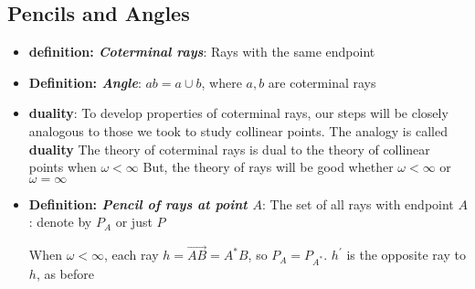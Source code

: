 \documentclass{report}
\begin{document}
    \pagebreak 
    \subsection{Pencils and Angles}
    \begin{itemize}
        \item \textbf{definition: \textit{Coterminal rays}}: Rays with the same endpoint
            \bigbreak \noindent 
            \begin{figure}[ht]
                \centering
                \label{fig:coterm}
            \end{figure}
            \bigbreak \noindent 
        \item \textbf{Definition: \textit{Angle}}: $ab = a \cup b $, where $a,b$ are coterminal rays
            \bigbreak \noindent 
            \begin{figure}[ht]
                \centering
                \label{fig:ang}
            \end{figure}
            \bigbreak \noindent 
        \item \textbf{duality}: To develop properties of coterminal rays, our steps will be closely analogous to those we took to study collinear points. The analogy is called \textbf{duality}
            \bigbreak \noindent 
            The theory of coterminal rays is dual to the theory of collinear points when $\omega < \infty$
            \bigbreak \noindent 
            But, the theory of rays will be good whether $\omega < \infty$ or $\omega = \infty$
        \item \textbf{Definition: \textit{Pencil of rays at point $A$}}: The set of all rays with endpoint $A$: denote by $P_{A}$ or just $P$
            \bigbreak \noindent 
            \begin{figure}[ht]
                \centering
                \label{fig:pencil}
            \end{figure}
            \bigbreak \noindent 
            When $\omega < \infty$, each ray $h = \overrightarrow{AB} = A^{*}B$, so $P_{A} = P_{A^{*}} $. $h^{\prime} $ is the opposite ray to $h$, as before
            \bigbreak \noindent 
            \begin{figure}[ht]
                \centering
                \label{fig:circ}
            \end{figure}
            \bigbreak \noindent 


\end{itemize}
\end{document}
